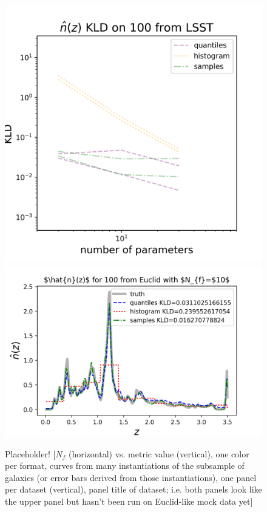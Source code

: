\documentclass[\docopts]{\docclass}
\begin{document}
\begin{figure}
  
\includegraphics[width=0.9\columnwidth]{figures/lsst_stacked_placeholder.png}\\
  
\includegraphics[width=0.9\columnwidth]{figures/euclid_stacked_placeholder.png}
  \caption{Placeholder!
  [$N_{f}$ (horizontal) vs. metric value (vertical), one color per format, 
curves from many instantiations of the subsample of galaxies (or error bars 
derived from those instantiations), one panel per dataset (vertical), panel 
title of dataset; i.e. both panels look like the upper panel but hasn't been 
run on Euclid-like mock data yet]
  \label{fig:stacked}}
\end{figure}
\end{document}
